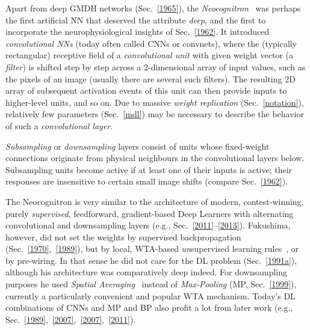 \documentclass[letterpaper]{article}
\begin{document}
\begin{CJK*}{UTF8}{gbsn}
Apart from deep GMDH networks (Sec.~\ref{1965}),
the {\em Neocognitron}~\citep{Fukushima:1979neocognitron,fukushima:1980,Fukushima:2013}
was perhaps the first artificial NN that deserved the attribute {\em deep}, and the first 
to incorporate the  neurophysiological insights of Sec.~\ref{1962}. 
It introduced {\em convolutional NNs} (today often called CNNs or convnets), where the
(typically rectangular) receptive field of a {\em convolutional unit} with given weight vector (a {\em filter})
is shifted step by step across a 2-dimensional array of input values, such as the pixels of an image (usually there are several such filters). 
The resulting 2D array of subsequent activation events of this unit can then provide inputs to higher-level units, and so on.
Due to massive {\em weight replication} (Sec.~\ref{notation}),  
relatively few parameters (Sec.~\ref{mdl}) 
may be necessary to describe the behavior of such a {\em convolutional layer}.

{\em Subsampling} or {\em downsampling} layers consist of units whose fixed-weight connections originate from physical neighbours in the convolutional layers below. 
Subsampling units become active if at least one of their inputs is active;
their responses are insensitive to certain small image shifts (compare Sec.~\ref{1962}).



The Neocognitron is
very similar to the architecture of modern, contest-winning, purely {\em  supervised}, 
feedforward, gradient-based Deep Learners with alternating convolutional and downsampling layers
(e.g., Sec.~\ref{2011}--\ref{2013}).
Fukushima, however, did not set the weights by supervised
backpropagation (Sec.~\ref{1970},~\ref{1989}),
but by local, WTA-based
{\em un}supervised learning rules~\citep[e.g.,][]{Fukushima:2013b}, or by pre-wiring. 
In that sense he did not care for the  
DL problem (Sec.~\ref{1991a}), 
although his architecture was comparatively deep indeed. For downsampling purposes
he used {\em  Spatial Averaging}~\citep{fukushima:1980,Fukushima:2011} instead of {\em Max-Pooling} (MP, Sec.~\ref{1999}),
currently a particularly convenient and popular WTA mechanism. 
Today's DL combinations of CNNs and MP and BP also profit a lot from
later work (e.g., Sec.~\ref{1989},~\ref{2007},~\ref{2007},~\ref{2011}).



\end{CJK*}
\end{document}
